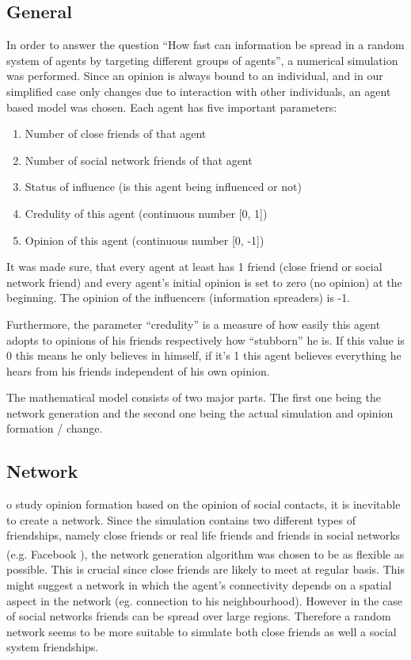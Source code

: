 \documentclass[11pt]{article}
\begin{document}
\subsection{General}
In order to answer the question “How fast can information be spread in a random system of agents by targeting different groups of agents”, a numerical simulation was performed. Since an opinion is always bound to an individual, and in our simplified case only changes due to interaction with other individuals, an agent based model was chosen. Each agent has five important parameters:
\begin{enumerate}
	\item Number of close friends of that agent 
	\item Number of social network friends of that agent
	\item Status of influence (is this agent being influenced or not)
	\item Credulity of this agent (continuous number [0, 1])
	\item Opinion of this agent (continuous number [0, -1])
\end{enumerate}
It was made sure, that every agent at least has 1 friend (close friend or social network friend) and every agent’s initial opinion is set to zero (no opinion) at the beginning. The opinion of the influencers (information spreaders) is -1.
  
Furthermore, the parameter “credulity” is a measure of how easily this agent adopts to opinions of his friends respectively how “stubborn” he is. If this value is 0 this means he only believes in himself, if it’s 1 this agent believes everything he hears from his friends independent of his own opinion.

The mathematical model consists of two major parts. The first one being the network generation and the second one being the actual simulation and opinion formation / change.

\subsection{Network}
o study opinion formation based on the opinion of social contacts, it is inevitable to create a network. Since the simulation contains two different types of friendships, namely close friends or real life friends and friends in social networks (e.g. Facebook \textsuperscript{\textregistered}), the network generation algorithm was chosen to be as flexible as possible. This is crucial since close friends are likely to meet at regular basis. This might suggest a network in which the agent’s connectivity depends on a spatial aspect in the network (eg. connection to his neighbourhood). However in the case of social networks friends can be spread over large regions. Therefore a random network seems to be more suitable to simulate both close friends as well a social system friendships.
\end{document}
